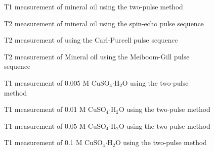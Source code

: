 
  
  \begin{figure}[h]
    \resizebox{0.75\textwidth}{!}{}
    \caption{T1 measurement of mineral oil using the two-pulse method }
    \label{figAp:mo_t1}
  \end{figure}

  \begin{figure}[h]
    \resizebox{0.75\textwidth}{!}{}
    \caption{T2 measurement of mineral oil using the spin-echo pulse sequence }
    \label{figAp:mo_se}
  \end{figure}

  \begin{figure}[h]
    \resizebox{0.75\textwidth}{!}{}
    \caption{T2 measurement of  using the Carl-Purcell pulse sequence }
    \label{figAp:mo_cp}
  \end{figure}

  \begin{figure}[h]
    \resizebox{0.75\textwidth}{!}{}
    \caption{T2 measurement of Mineral oil using the Meiboom-Gill pulse sequence }
    \label{figAp:mo_t2}
  \end{figure}

  
  \begin{figure}[h]
    \resizebox{0.75\textwidth}{!}{}
    \caption{T1 measurement of 0.005 M  CuSO$_{4} \boldsymbol{\cdot} $H$_2$O using the two-pulse method }
    \label{figAp:0d005_t1}
  \end{figure}

  \begin{figure}[h]
    \resizebox{0.75\textwidth}{!}{}
    \caption{T1 measurement of 0.01 M  CuSO$_{4} \boldsymbol{\cdot} $H$_2$O using the two-pulse method }
    \label{figAp:0d01_t1}
  \end{figure}

  \begin{figure}[h]
    \resizebox{0.75\textwidth}{!}{}
    \caption{T1 measurement of 0.05 M  CuSO$_{4} \boldsymbol{\cdot} $H$_2$O using the two-pulse method }
    \label{figAp:0d05_t1}
  \end{figure}

  \begin{figure}[h]
    \resizebox{0.75\textwidth}{!}{}
    \caption{T1 measurement of 0.1 M  CuSO$_{4} \boldsymbol{\cdot} $H$_2$O using the two-pulse method }
    \label{figAp:0d1_t1}
  \end{figure}

